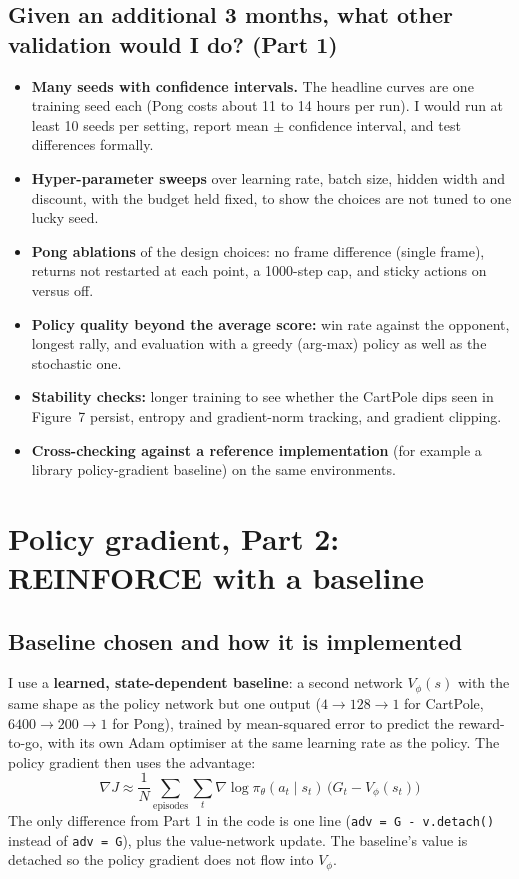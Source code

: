 \documentclass[10pt,a4paper]{article}
\newcommand{\code}[1]{\texttt{#1}}
\begin{document}
\subsection{Given an additional 3 months, what other validation would I do? (Part 1)}
\begin{itemize}
  \item \textbf{Many seeds with confidence intervals.} The headline curves are one training seed each (Pong costs about 11 to 14 hours per
        run). I would run at least 10 seeds per setting, report mean $\pm$ confidence interval, and test differences formally.
  \item \textbf{Hyper-parameter sweeps} over learning rate, batch size, hidden width and discount, with the budget held fixed, to show the
        choices are not tuned to one lucky seed.
  \item \textbf{Pong ablations} of the design choices: no frame difference (single frame), returns not restarted at each point, a 1000-step
        cap, and sticky actions on versus off.
  \item \textbf{Policy quality beyond the average score:} win rate against the opponent, longest rally, and evaluation with a greedy
        (arg-max) policy as well as the stochastic one.
  \item \textbf{Stability checks:} longer training to see whether the CartPole dips seen in Figure~7 persist, entropy and gradient-norm
        tracking, and gradient clipping.
  \item \textbf{Cross-checking against a reference implementation} (for example a library policy-gradient baseline) on the same environments.
\end{itemize}

\section{Policy gradient, Part 2: REINFORCE with a baseline}

\subsection{Baseline chosen and how it is implemented}
I use a \textbf{learned, state-dependent baseline}: a second network $V_\phi(s)$ with the same shape as the policy network but one output
($4\to128\to1$ for CartPole, $6400\to200\to1$ for Pong), trained by mean-squared error to predict the reward-to-go, with its own Adam
optimiser at the same learning rate as the policy. The policy gradient then uses the advantage:
\[
\nabla J\approx\frac1N\sum_{\text{episodes}}\sum_t \nabla\log\pi_\theta(a_t\mid s_t)\,\big(G_t-V_\phi(s_t)\big)
\]
The only difference from Part 1 in the code is one line (\code{adv = G - v.detach()} instead of \code{adv = G}), plus the value-network
update. The baseline's value is detached so the policy gradient does not flow into $V_\phi$.
\end{document}

